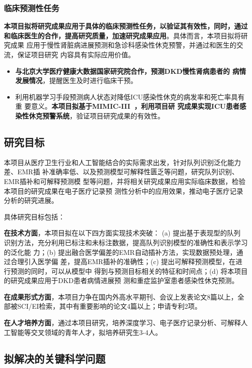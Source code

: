 \subsubsection{临床预测性任务}

\textbf{本项目拟将研究成果应用于具体的临床预测性任务，以验证其有效性，同时，通过
和临床医生的合作，提高研究质量，加速研究成果应用}。具体而言，本项目拟将研究成果
应用于慢性肾脏病进展预测和急诊科感染性休克预警，并通过和医生的交流，保证项目研究
内容具有实际应用价值。

\begin{itemize}
    \item  \textbf{与北京大学医疗健康大数据国家研究院合作，预测DKD慢性肾病患者的
    病情发展情况}，提醒医生及时进行临床干预。
    \item  利用机器学习手段预测病人状态对降低ICU感染性休克的病发率和死亡率具有重
    要意义。\textbf{本项目拟基于MIMIC-III~，利用项目研
    究成果实现ICU患者感染性休克预警系统}，验证项目研究成果的有效性。
\end{itemize}


\subsection{研究目标}\label{ch2target}

本项目从医疗卫生行业和人工智能结合的实际需求出发，针对队列识别泛化能力差、EMR插
补准确率低、以及预测模型可解释性匮乏等问题，研究队列识别、EMR插补和可解释预测模
型等问题，并将相关研究成果应用实际临床数据，检验本项目的研究成果在电子医疗记录预
测性分析中的应用效果，推动电子医疗记录分析的研究进展。

具体研究目标包括：

\textbf{在技术方面}，本项目拟在以下四方面实现技术突破： (a) 提出基于表现型的队列
识别方法，充分利用已标注和未标注数据，提高队列识别模型的准确性和表示学习的泛化能
力；(b) 提出融合医学偏差的EMR自动插补方法，实现数据预处理，通过合理引入医学偏
差，提高EMR插补的准确性；(c) 提出可解释预测模型，在进行预测的同时，可以从模型中
得到与预测目标相关的特征和时间点；(d) 将本项目的研究成果应用于DKD患者病情进展预
测和重症监护室患者感染性休克预测。

\textbf{在成果形式方面}，本项目力争在国内外高水平期刊、会议上发表论文8篇以上，全
部被SCI/EI检索，其中有重要影响的论文4篇以上；申请专利2项。

\textbf{在人才培养方面}，通过本项目研究，培养深度学习、电子医疗记录分析、可解释人工智能等交叉领域的青年人才，拟培养研究生3-4人。

\subsection{拟解决的关键科学问题}

